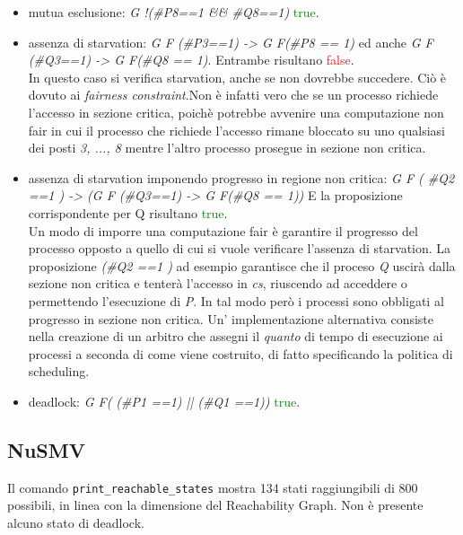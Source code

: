 \documentclass[a4paper]{article}
\begin{document}
\begin{itemize}
	\item mutua esclusione: \textit{G !(\#P8==1 \&\& \#Q8==1)} \textcolor{green}{true}.
	\item assenza di starvation: \textit{G F (\#P3==1) -> G F(\#P8 == 1)} ed anche \textit{G F (\#Q3==1) -> G F(\#Q8 == 1)}. Entrambe risultano \textcolor{red}{false}.\\
	In questo caso si verifica starvation, anche se non dovrebbe succedere. Ciò è dovuto ai \textit{fairness constraint}.Non è infatti vero che se un processo richiede l'accesso in sezione critica, poichè potrebbe avvenire una computazione non fair in cui il processo che richiede l'accesso rimane bloccato su uno qualsiasi dei posti \textit{3, ..., 8} mentre l'altro processo prosegue in sezione non critica.
	\item assenza di starvation imponendo progresso in regione non critica: \textit{G F ( \#Q2 ==1 ) -> (G F (\#Q3==1) -> G F(\#Q8 == 1))} E la proposizione corrispondente per Q risultano \textcolor{green}{true}.\\
		Un modo di imporre una computazione fair è garantire il progresso del processo opposto a quello di cui si vuole verificare l'assenza di starvation. La proposizione \textit{(\#Q2 ==1 )} ad esempio garantisce che il proceso \textit{Q} uscirà dalla sezione non critica e tenterà l'accesso in \textit{cs}, riuscendo ad acceddere o permettendo l'esecuzione di \textit{P}. In tal modo però i processi sono obbligati al progresso in sezione non critica.
		Un' implementazione alternativa consiste nella creazione di un arbitro che assegni il \textit{quanto} di tempo di esecuzione ai processi a seconda di come viene costruito, di fatto specificando la politica di scheduling.
	\item deadlock: \textit{G F( (\#P1 ==1) ||  (\#Q1 ==1))} \textcolor{green}{true}.
\end{itemize}
\newpage
\subsection{NuSMV}

Il comando \texttt{print\_reachable\_states} mostra 134 stati raggiungibili di 800 possibili, in linea con la dimensione del Reachability Graph.
Non è presente alcuno stato di deadlock.\\
\end{document}
